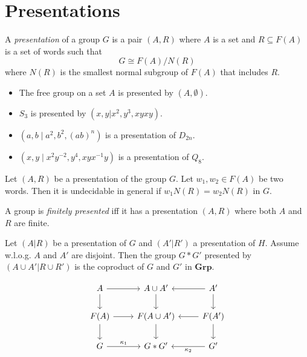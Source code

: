 \section{Presentations}

\begin{df}[Presentation]
A \emph{presentation} of a group $G$ is a pair $(A,R)$ where $A$ is a set and $R \subseteq F(A)$ is a set of words such that
\[ G \cong F(A) / N(R) \]
where $N(R)$ is the smallest normal subgroup of $F(A)$ that includes $R$.
\end{df}

\begin{ex}
\begin{itemize}
\item The free group on a set $A$ is presented by $(A, \emptyset)$.
\item $S_3$ is presented by $(x,y|x^2,y^3,xyxy)$.
\item 
$(a,b \mid a^2, b^2, (ab)^n)$ is a presentation of $D_{2n}$.
\item $(x,y \mid x^2 y^{-2}, y^4, xyx^{-1}y)$ is a presentation of $Q_8$.
\end{itemize}
\end{ex}

\begin{prop}
Let $(A,R)$ be a presentation of the group $G$. Let $w_1, w_2 \in F(A)$ be two words. Then it is undecidable in general if $w_1N(R) = w_2N(R)$ in $G$.
\end{prop}

\begin{df}
A group is \emph{finitely presented} iff it has a presentation $(A,R)$ where both $A$ and $R$ are finite.
\end{df}

\begin{prop}
Let $(A|R)$ be a presentation of $G$ and $(A'|R')$ a presentation of $H$. Assume w.l.o.g. $A$ and $A'$ are disjoint. Then the group $G * G'$ presented by $(A \cup A' | R \cup R')$ is the coproduct of $G$ and $G'$ in $\mathbf{Grp}$.
\end{prop}

\[ \begin{tikzcd}
A \arrow[d] \arrow[r] & A \cup A' \arrow[d] & A' \arrow[l] \arrow[d] \\
 F(A) \arrow[d] \arrow[r] & F(A \cup A') \arrow[d] & F(A') \arrow[l] \arrow[d] \\
G \arrow[r, "\kappa_1"] & G * G' & G' \arrow[l, "\kappa_2"]
\end{tikzcd} \]

